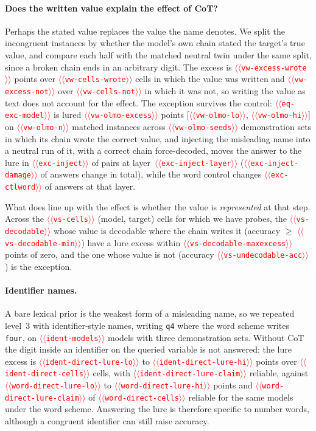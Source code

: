 \documentclass[11pt]{article}
\providecommand{\NUM}[1]{\textcolor{red}{$\langle\langle$\texttt{#1}$\rangle\rangle$}}
\begin{document}
\paragraph{Does the written value explain the effect of CoT?} Perhaps the stated value replaces
the value the name denotes. We split the incongruent instances by whether the model's own chain
stated the target's true value, and compare each half with the matched neutral twin under the
same split, since a broken chain ends in an arbitrary digit. The excess is \NUM{vw-excess-wrote} points over
\NUM{vw-cells-wrote} cells in which the value was written and \NUM{vw-excess-not} over
\NUM{vw-cells-not} in which it was not, so writing the value as text does not account for the
effect. The exception survives the control: \NUM{eq-exc-model} is lured \NUM{vw-olmo-excess}
points [\NUM{vw-olmo-lo}, \NUM{vw-olmo-hi}] on \NUM{vw-olmo-n} matched instances across \NUM{vw-olmo-seeds} demonstration sets in which its chain
wrote the correct value, and injecting the misleading name into a neutral run of it, with a
correct chain force-decoded, moves the answer to the lure in \NUM{exc-inject} of pairs at
layer~\NUM{exc-inject-layer} (\NUM{exc-inject-damage} of answers change in total), while the
word control changes \NUM{exc-ctlword} of answers at that layer.

What does line up with the effect is whether the value is \emph{represented} at that step.
Across the \NUM{vs-cells} (model, target) cells for which we have probes, the
\NUM{vs-decodable} whose value is decodable where the chain writes it (accuracy $\geq$
\NUM{vs-decodable-min}) have a lure excess within \NUM{vs-decodable-maxexcess} points of zero,
and the one whose value is not (accuracy \NUM{vs-undecodable-acc}) is the exception.

\paragraph{Identifier names.} A bare lexical prior is the weakest form of a misleading name, so
we repeated level~3 with identifier-style names, writing \texttt{q4} where the word scheme
writes \texttt{four}, on \NUM{ident-models} models with three demonstration sets. Without CoT the digit inside an identifier on the queried variable is not answered: the lure excess
is \NUM{ident-direct-lure-lo} to \NUM{ident-direct-lure-hi} points over
\NUM{ident-direct-cells} cells, with \NUM{ident-direct-lure-claim} reliable, against
\NUM{word-direct-lure-lo} to \NUM{word-direct-lure-hi} points and
\NUM{word-direct-lure-claim} of \NUM{word-direct-cells} reliable for the same models under the
word scheme. Answering the lure is therefore specific to number words, although a congruent
identifier can still raise accuracy.
\end{document}
